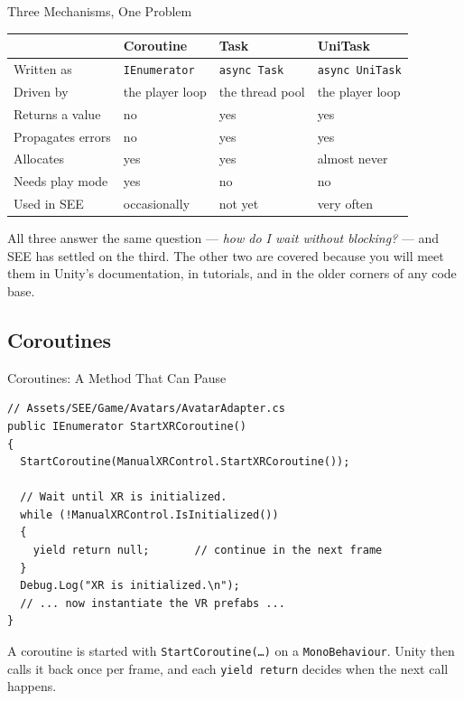 \begin{frame}{Three Mechanisms, One Problem}
  \begin{center}
    \footnotesize
    \begin{tabular}{llll}
      \hline
      & \textbf{Coroutine} & \textbf{Task} & \textbf{UniTask}\\
      \hline
      Written as        & \texttt{IEnumerator}  & \texttt{async Task} & \texttt{async UniTask}\\
      Driven by         & the player loop       & the thread pool     & the player loop\\
      Returns a value   & no                    & yes                 & yes\\
      Propagates errors & no                    & yes                 & yes\\
      Allocates         & yes                   & yes                 & almost never\\
      Needs play mode   & yes                   & no                  & no\\
      Used in SEE       & occasionally          & not yet             & very often\\
      \hline
    \end{tabular}
  \end{center}
  \vspace{2ex}

  All three answer the same question --- \emph{how do I wait without
  blocking?} --- and SEE has settled on the third. The other two are covered
  because you will meet them in Unity's documentation, in tutorials, and in
  the older corners of any code base.
\end{frame}

\subsection{Coroutines}

\begin{frame}[fragile]{Coroutines: A Method That Can Pause}
  \begin{lstlisting}[basicstyle=\scriptsize\ttfamily]
// Assets/SEE/Game/Avatars/AvatarAdapter.cs
public IEnumerator StartXRCoroutine()
{
  StartCoroutine(ManualXRControl.StartXRCoroutine());

  // Wait until XR is initialized.
  while (!ManualXRControl.IsInitialized())
  {
    yield return null;       // continue in the next frame
  }
  Debug.Log("XR is initialized.\n");
  // ... now instantiate the VR prefabs ...
}
  \end{lstlisting}
  \vspace{1ex}

  A coroutine is started with \texttt{StartCoroutine(\ldots)} on a
  \texttt{MonoBehaviour}. Unity then calls it back once per frame, and each
  \texttt{yield return} decides when the next call happens.
\end{frame}

